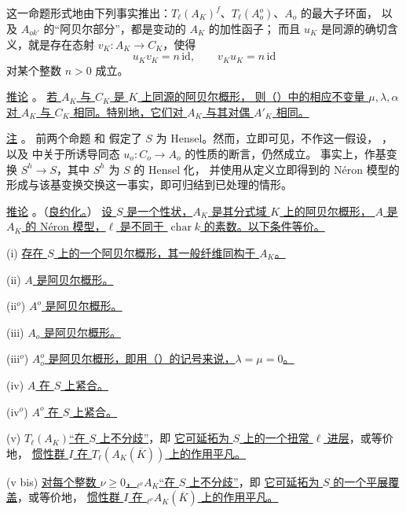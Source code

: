 这一命题形式地由下列事实推出：$T_\ell(A_K)^f$、$T_\ell(A_o^o)$、$A_o$ 的最大子环面，
以及 $A_{ok'}$ 的“阿贝尔部分”，都是变动的 $A_K$ 的加性函子；
而且 $u_K$ 是同源的确切含义，就是存在态射 $v_K:A_K\longrightarrow C_K$，使得
\[
 u_Kv_K=n\,\mathrm{id},\qquad v_Ku_K=n\,\mathrm{id}
\]
对某个整数 $n>0$ 成立。

\medskip
\noindent
\underline{推论} 。
\underline{若 $A_K$ 与 $C_K$ 是 $K$ 上同源的阿贝尔概形，
则（）中的相应不变量 $\mu,\lambda,\alpha$
对 $A_K$ 与 $C_K$ 相同。特别地，它们对 $A_K$ 与其对偶 $A'_K$ 相同。}

\medskip
\noindent
\underline{注} 。
前两个命题  和 
假定了 $S$ 为 Hensel。然而，立即可见，不作这一假设，
，以及 
中关于所诱导同态 $u_o:C_o\longrightarrow A_o$ 的性质的断言，仍然成立。
事实上，作基变换 $S^h\longrightarrow S$，其中 $S^h$ 为 $S$ 的 Hensel 化，
并使用从定义立即得到的 N\'eron 模型的形成与该基变换交换这一事实，即可归结到已处理的情形。

\medskip
\noindent
\underline{推论} 。（\underline{良约化。}）
\underline{设 $S$ 是一个性状，$A_K$ 是其分式域 $K$ 上的阿贝尔概形，
$A$ 是 $A_K$ 的 N\'eron 模型，$\ell$ 是不同于 $\operatorname{char}k$ 的素数。以下条件等价。}

\smallskip
\noindent
(i) \underline{存在 $S$ 上的一个阿贝尔概形，其一般纤维同构于 $A_K$。}

\noindent
(ii) \underline{$A$ 是阿贝尔概形。}

\noindent
(ii$^o$) \underline{$A^o$ 是阿贝尔概形。}

\noindent
(iii) \underline{$A_o$ 是阿贝尔概形。}

\noindent
(iii$^o$) \underline{$A_o^o$ 是阿贝尔概形，即用（）的记号来说，$\lambda=\mu=0$。}

\noindent
(iv) \underline{$A$ 在 $S$ 上紧合。}

\noindent
(iv$^o$) \underline{$A^o$ 在 $S$ 上紧合。}

\noindent
(v) \underline{$T_\ell(A_K)$“在 $S$ 上不分歧”}，即
\underline{它可延拓为 $S$ 上的一个扭常 $\ell$ 进层}，或等价地，
\underline{惯性群 $I$ 在 $T_\ell(A_K(\overline K))$ 上的作用平凡。}

\noindent
(v bis) \underline{对每个整数 $\nu\geq0$，${}_{\ell^\nu}A_K$“在 $S$ 上不分歧”}，即
\underline{它可延拓为 $S$ 的一个平展覆盖}，或等价地，
\underline{惯性群 $I$ 在 ${}_{\ell^\nu}A_K(\overline K)$ 上的作用平凡。}

